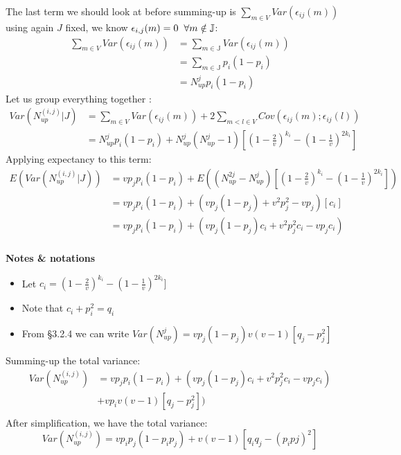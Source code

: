 \documentclass{article}
\begin{document}
The last term we should look at before summing-up is $\sum_{m\in V}Var(\epsilon_{ij}(m))$ using again $J$ fixed, we know $\epsilon_{i,j}(m) = 0 \hspace{0.20cm}\forall m \notin \mathbb{J}$:
\[\begin{split}
    \sum_{m\in V}Var(\epsilon_{ij}(m))&= \sum_{m\in \mathbb{J}}Var(\epsilon_{ij}(m))\\
                                      &=  \sum_{m\in \mathbb{J}}p_i(1-p_i) \\
                                      &=N^j_{up}p_i(1-p_i)
\end{split}
\]
Let us group everything together :
\[\begin{split}
    Var(N^{(i,j)}_{up}|J) &= \sum_{m\in V}Var(\epsilon_{ij}(m)) + 2\sum_{m < l \in V}Cov(\epsilon_{ij}(m); \epsilon_{ij}(l)) \\
                          &= N^j_{up}p_i(1-p_i)+ N^j_{up}(N^j_{up}-1)[(1-\frac{2}{v})^{k_i} - (1-\frac{1}{v})^{2k_i}]
\end{split}
\]
Applying expectancy to this term:
\[\begin{split}
E(Var(N^{(i,j)}_{up}|J)) &= vp_jp_i(1-p_i) + E((N^{2j}_{up} - N^j_{up})[(1-\frac{2}{v})^{k_i} - (1-\frac{1}{v})^{2k_i}]) \\
    &= vp_jp_i(1-p_i) + (vp_j(1-p_j) + v^2p^2_j - vp_j)[c_i] \\
    &= vp_jp_i(1-p_i) + (vp_j(1-p_j)c_i + v^2p^2_jc_i - vp_jc_i) \\
\end{split}
\]

\textbf{Notes \& notations}
\begin{itemize}
    \item Let $c_i = (1-\frac{2}{v})^{k_i} - (1-\frac{1}{v})^{2k_i}]$
    \item Note that $c_i + p^2_i = q_i$
    \item From \S3.2.4 we can write $Var(N^j_{up}) = vp_j(1-p_j) v(v-1)[q_j-p_j^2]$
\end{itemize}

Summing-up the total variance:
\[\begin{split}
    Var(N^{(i,j)}_{up}) &= vp_jp_i(1-p_i) + (vp_j(1-p_j)c_i + v^2p^2_jc_i - vp_jc_i) \\
        &+vp_iv(v-1)[q_j-p_j^2]) \\
\end{split}
\]
After simplification, we have the total variance:
\begin{equation}
    Var(N^{(i,j)}_{up}) = vp_ip_j(1-p_ip_j) + v(v-1)[q_iq_j-(p_ipj)^2]
\end{equation}
\end{document}
